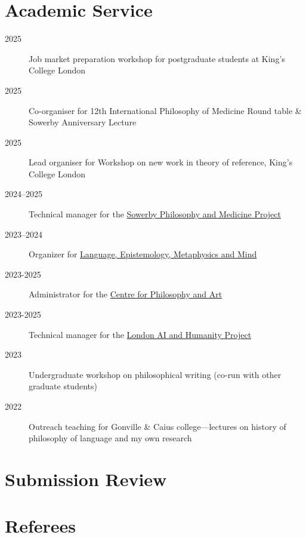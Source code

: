 \documentclass{cv}
\begin{document}
\section*{Academic Service}
\begin{description}
\item[{2025}] Job market preparation workshop for postgraduate students at King's College London
\item[{2025}] Co-organiser for 12th International Philosophy of
Medicine Round table \& Sowerby Anniversary Lecture
\item[{2025}] Lead organiser for Workshop on new work in theory of reference, King's College London
\item[{2024--2025}] Technical manager for the \href{https://www.philosophyandmedicine.org/}{Sowerby Philosophy and
Medicine Project}
\item[{2023--2024}] Organizer for \href{https://www.lemm-london.co.uk/}{Language, Epistemology, Metaphysics and Mind}
\item[{2023-2025}] Administrator for the \href{https://philosophyarts.co.uk/}{Centre for Philosophy and Art}
\item[{2023-2025}] Technical manager for the \href{https://www.ai-humanity-london.com/}{London AI and Humanity Project}
\item[{2023}] Undergraduate workshop on philosophical writing (co-run with other graduate students)
\item[{2022}] Outreach teaching for Gonville \& Caius college---lectures on
history of philosophy of language and my own research
\end{description}

\section*{Submission Review}

\begin{adjustwidth}{\dategutter}{}
\end{adjustwidth}

\section*{Referees }
\end{document}
